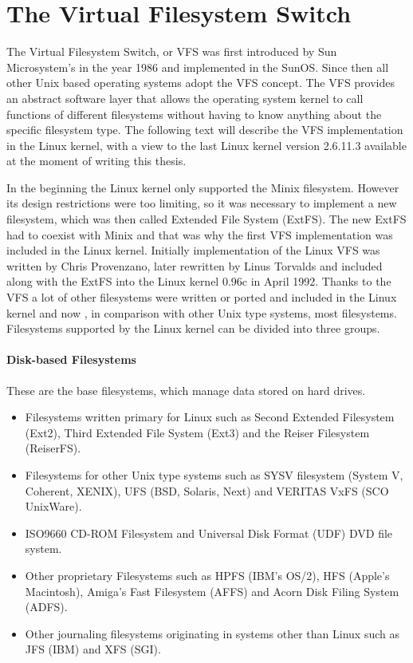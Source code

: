 \chapter{The Virtual Filesystem Switch}
The Virtual Filesystem Switch, or VFS was first introduced by Sun Microsystem's
in the year 1986 and implemented in the SunOS. Since then all other Unix based
operating systems adopt the VFS concept. The VFS provides an abstract software layer
that allows the operating system kernel to call functions of different filesystems
without having to know anything about the specific filesystem type. The following
text will describe the VFS implementation in the Linux kernel, with a view to the last
Linux kernel version 2.6.11.3 available at the moment of writing this thesis. 

In the beginning the Linux kernel only supported the Minix filesystem. However its design
restrictions were too limiting, so it was necessary to implement a new filesystem,
which was then called Extended File System (ExtFS). The new ExtFS had to coexist with
Minix and that was why the first VFS implementation was included in the Linux kernel.
Initially implementation of the Linux VFS was written by Chris Provenzano, later
rewritten by Linus Torvalds and included along with the ExtFS into the Linux kernel
0.96c in April 1992. Thanks to the VFS a lot of other filesystems were written or
ported and included in the Linux kernel and now , in comparison with
other Unix type systems, most filesystems. Filesystems supported by the Linux kernel can
be divided into three groups.

\subsubsection*{Disk-based Filesystems}
These are the base filesystems, which manage data stored on hard drives.
\begin{itemize}
	\item Filesystems written primary for Linux such as Second Extended Filesystem
		(Ext2), Third Extended File System (Ext3) and the Reiser Filesystem
		(ReiserFS).
	\item Filesystems for other Unix type systems such as SYSV filesystem
		(System V, Coherent, XENIX), UFS (BSD, Solaris, Next) and VERITAS VxFS
		(SCO UnixWare).
	\item ISO9660 CD-ROM Filesystem and Universal Disk Format (UDF) DVD file
		system.
	\item Other proprietary Filesystems such as HPFS (IBM's OS/2), HFS (Apple's
		Macintosh), Amiga's Fast Filesystem (AFFS) and Acorn Disk Filing
		System (ADFS).
	\item Other journaling filesystems originating in systems other than Linux
		such as JFS (IBM) and XFS (SGI).
\end{itemize}

